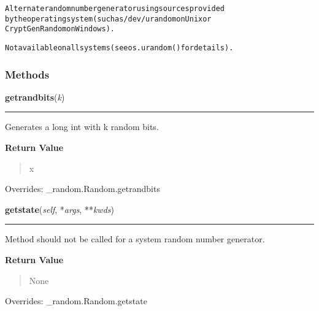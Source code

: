 \begin{alltt}
Alternate random number generator using sources provided
by the operating system (such as /dev/urandom on Unix or
CryptGenRandom on Windows).

 Not available on all systems (see os.urandom() for details).
\end{alltt}



  \subsubsection{Methods}

    \vspace{0.5ex}

\hspace{.8\funcindent}\begin{boxedminipage}{\funcwidth}

    \raggedright \textbf{getrandbits}(\textit{k})

    \vspace{-1.5ex}

    \rule{\textwidth}{0.5\fboxrule}
\setlength{\parskip}{2ex}
    Generates a long int with k random bits.

\setlength{\parskip}{1ex}
      \textbf{Return Value}
    \vspace{-1ex}

      \begin{quote}
      x

      \end{quote}

      Overrides: \_random.Random.getrandbits

    \end{boxedminipage}

    \vspace{0.5ex}

\hspace{.8\funcindent}\begin{boxedminipage}{\funcwidth}

    \raggedright \textbf{getstate}(\textit{self}, *\textit{args}, **\textit{kwds})

    \vspace{-1.5ex}

    \rule{\textwidth}{0.5\fboxrule}
\setlength{\parskip}{2ex}
    Method should not be called for a system random number generator.

\setlength{\parskip}{1ex}
      \textbf{Return Value}
    \vspace{-1ex}

      \begin{quote}
      None

      \end{quote}

      Overrides: \_random.Random.getstate

    \end{boxedminipage}

